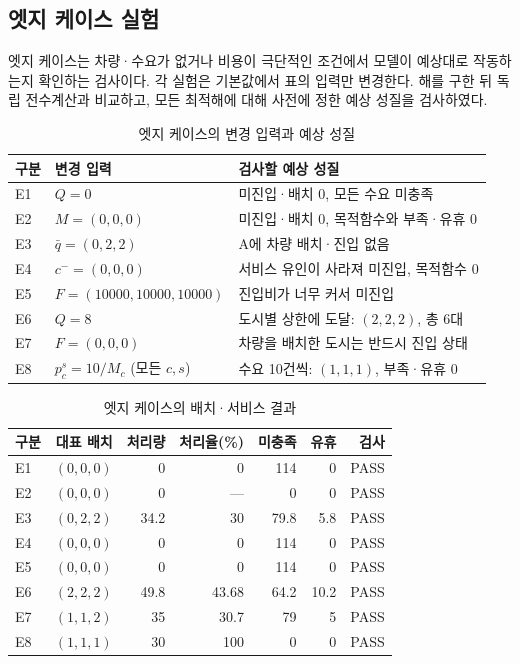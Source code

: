 \documentclass[10pt,a4paper]{article}
\begin{document}
\subsection{엣지 케이스 실험}
엣지 케이스는 차량·수요가 없거나 비용이 극단적인 조건에서 모델이 예상대로 작동하는지 확인하는 검사이다.
각 실험은 기본값에서 표의 입력만 변경한다. 해를 구한 뒤 독립 전수계산과 비교하고,
모든 최적해에 대해 사전에 정한 예상 성질을 검사하였다.
\begin{table}[H]
\centering\small
\caption{엣지 케이스의 변경 입력과 예상 성질}\label{tab:sc-edge-design}
\begin{tabular}{lP{.36\linewidth}P{.47\linewidth}}
\toprule
구분 & 변경 입력 & 검사할 예상 성질\\\midrule
E1 & $Q=0$ & 미진입·배치 0, 모든 수요 미충족\\
E2 & $M=(0,0,0)$ & 미진입·배치 0, 목적함수와 부족·유휴 0\\
E3 & $\bar q=(0,2,2)$ & A에 차량 배치·진입 없음\\
E4 & $c^-=(0,0,0)$ & 서비스 유인이 사라져 미진입, 목적함수 0\\
E5 & $F=(10000,10000,10000)$ & 진입비가 너무 커서 미진입\\
E6 & $Q=8$ & 도시별 상한에 도달: $(2,2,2)$, 총 6대\\
E7 & $F=(0,0,0)$ & 차량을 배치한 도시는 반드시 진입 상태\\
E8 & $p_c^s=10/M_c$ (모든 $c,s$) & 수요 10건씩: $(1,1,1)$, 부족·유휴 0\\
\bottomrule
\end{tabular}
\end{table}
\begin{table}[H]
\centering\small
\caption{엣지 케이스의 배치·서비스 결과}\label{tab:sc-edge-service}
\begin{tabular}{lrrrrrr}
\toprule
구분 & 대표 배치 & 처리량 & 처리율(\%) & 미충족 & 유휴 & 검사\\\midrule
E1 & $(0,0,0)$ & 0 & 0 & 114 & 0 & PASS\\
E2 & $(0,0,0)$ & 0 & --- & 0 & 0 & PASS\\
E3 & $(0,2,2)$ & 34.2 & 30 & 79.8 & 5.8 & PASS\\
E4 & $(0,0,0)$ & 0 & 0 & 114 & 0 & PASS\\
E5 & $(0,0,0)$ & 0 & 0 & 114 & 0 & PASS\\
E6 & $(2,2,2)$ & 49.8 & 43.68 & 64.2 & 10.2 & PASS\\
E7 & $(1,1,2)$ & 35 & 30.7 & 79 & 5 & PASS\\
E8 & $(1,1,1)$ & 30 & 100 & 0 & 0 & PASS\\
\bottomrule
\end{tabular}
\end{table}
\end{document}
